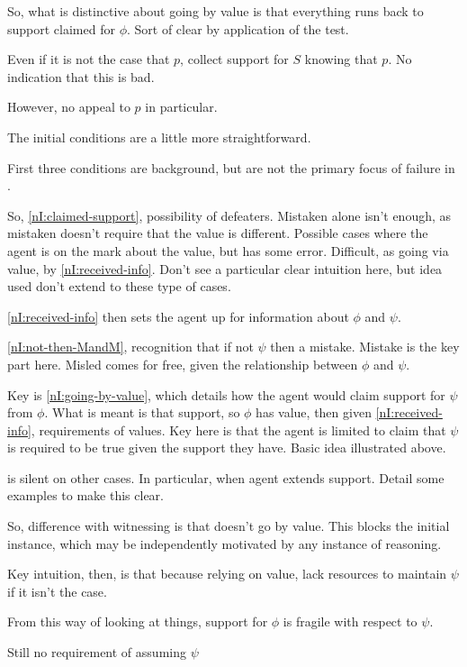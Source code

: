 \begin{note}
  So, what is distinctive about going by value is that everything runs back to support claimed for \(\phi\).
  Sort of clear by application of the \eit{} test.

  Even if it is not the case that \(p\), collect support for \(S\) knowing that \(p\).
  No indication that this is bad.

  However, no appeal to \(p\) in particular.
\end{note}

\begin{note}[Conditions]
  The initial conditions are a little more straightforward.

  First three conditions are background, but are not the primary focus of failure in \nI{}.

  So, \ref{nI:claimed-support}, possibility of defeaters.
  Mistaken alone isn't enough, as mistaken doesn't require that the value is different.
  Possible cases where the agent is on the mark about the value, but has some error.
  Difficult, as going via value, by \ref{nI:received-info}.
  Don't see a particular clear intuition here, but idea used don't extend to these type of cases.


  \ref{nI:received-info} then sets the agent up for information about \(\phi\) and \(\psi\).

  \ref{nI:not-then-MandM}, recognition that if not \(\psi\) then a mistake.
  Mistake is the key part here.
  Misled comes for free, given the relationship between \(\phi\) and \(\psi\).

  Key is \ref{nI:going-by-value}, which details how the agent would claim support for \(\psi\) from \(\phi\).
  What is meant is that support, so \(\phi\) has value, then given \ref{nI:received-info}, requirements of values.
  Key here is that the agent is limited to claim that \(\psi\) is required to be true given the support they have.
  Basic idea illustrated above.

  \nI{} is silent on other cases.
  In particular, when agent extends support.
  Detail some examples to make this clear.

  So, difference with witnessing is that doesn't go by value.
  This blocks the initial instance, which may be independently motivated by any instance of reasoning.

  Key intuition, then, is that because relying on value, lack resources to maintain \(\psi\) if it isn't the case.

  From this way of looking at things, support for \(\phi\) is fragile with respect to \(\psi\).

  Still no requirement of assuming \(\psi\)
\end{note}

